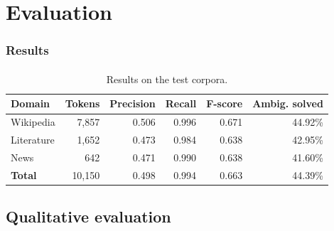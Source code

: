 \documentclass{beamer}
\begin{document}
\section{Evaluation}

\begin{frame}
\frametitle{Results}
\framesubtitle{}
\begin{table}
  \centering
  \begin{tabular}{l|rrrrr}
    \textbf{Domain} & \textbf{Tokens} & \textbf{Precision} & \textbf{Recall} & \textbf{F-score} & {Ambig. solved} \\
    \hline
    Wikipedia       & 7,857      & 0.506        & 0.996    & 0.671 & 44.92\%  \\
    Literature      & 1,652      & 0.473        & 0.984    & 0.638 & 42.95\%  \\
    News            & 642        & 0.471        & 0.990    & 0.638 & 41.60\%  \\
    \hline
    \textbf{Total}  & 10,150     & 0.498        &  0.994   & 0.663 & 44.39\% \\
  \end{tabular}
  \caption{Results on the test corpora.}
  \label{table:results}
\end{table}
\end{frame}

\subsection{Qualitative evaluation} %
\end{document}
